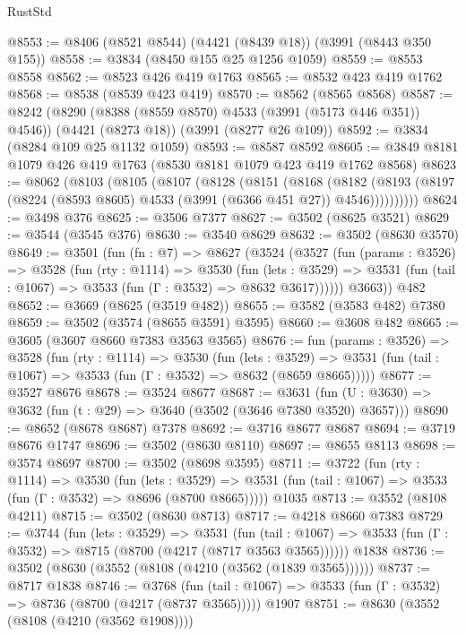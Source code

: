 \begin{lexlean}{RustStd}
\begin{coremodule}
@8553 := @8406 (@8521 @8544) (@4421 (@8439 @18)) (@3991 (@8443 @350 @155))
@8558 := @3834 (@8450 @155 @25 @1256 @1059)
@8559 := @8553 @8558
@8562 := @8523 @426 @419 @1763
@8565 := @8532 @423 @419 @1762
@8568 := @8538 (@8539 @423 @419)
@8570 := @8562 (@8565 @8568)
@8587 := @8242
    (@8290 (@8388 (@8559 @8570) @4533 (@3991 (@5173 @446 @351)) @4546))
    (@4421 (@8273 @18))
    (@3991 (@8277 @26 @109))
@8592 := @3834 (@8284 @109 @25 @1132 @1059)
@8593 := @8587 @8592
@8605 := @3849 @8181 @1079 @426 @419 @1763 (@8530 @8181 @1079 @423 @419 @1762 @8568)
@8623 := @8062
    (@8103
      (@8105
        (@8107
          (@8128
            (@8151
              (@8168
                (@8182
                  (@8193 (@8197 (@8224 (@8593 @8605) @4533 (@3991 (@6366 @451 @27)) @4546))))))))))
@8624 := @3498 @376
@8625 := @3506 @7377
@8627 := @3502 (@8625 @3521)
@8629 := @3544 (@3545 @376)
@8630 := @3540 @8629
@8632 := @3502 (@8630 @3570)
@8649 := @3501
    (fun (fn : @7) =>
    @8627
      (@3524
        (@3527
          (fun (params : @3526) =>
          @3528
            (fun (rty : @1114) =>
            @3530
              (fun (lets : @3529) =>
              @3531 (fun (tail : @1067) => @3533 (fun (Γ : @3532) => @8632 @3617))))))
        @3663))
    @482
@8652 := @3669 (@8625 (@3519 @482))
@8655 := @3582 (@3583 @482) @7380
@8659 := @3502 (@3574 (@8655 @3591) @3595)
@8660 := @3608 @482
@8665 := @3605 (@3607 @8660 @7383 @3563 @3565)
@8676 := fun (params : @3526) =>
  @3528
    (fun (rty : @1114) =>
    @3530
      (fun (lets : @3529) =>
      @3531 (fun (tail : @1067) => @3533 (fun (Γ : @3532) => @8632 (@8659 @8665)))))
@8677 := @3527 @8676
@8678 := @3524 @8677
@8687 := @3631 (fun (U : @3630) => @3632 (fun (t : @29) => @3640 (@3502 (@3646 @7380 @3520) @3657)))
@8690 := @8652 (@8678 @8687) @7378
@8692 := @3716 @8677 @8687
@8694 := @3719 @8676 @1747
@8696 := @3502 (@8630 @8110)
@8697 := @8655 @8113
@8698 := @3574 @8697
@8700 := @3502 (@8698 @3595)
@8711 := @3722
    (fun (rty : @1114) =>
    @3530
      (fun (lets : @3529) =>
      @3531 (fun (tail : @1067) => @3533 (fun (Γ : @3532) => @8696 (@8700 @8665)))))
    @1035
@8713 := @3552 (@8108 @4211)
@8715 := @3502 (@8630 @8713)
@8717 := @4218 @8660 @7383
@8729 := @3744
    (fun (lets : @3529) =>
    @3531
      (fun (tail : @1067) => @3533 (fun (Γ : @3532) => @8715 (@8700 (@4217 (@8717 @3563 @3565))))))
    @1838
@8736 := @3502 (@8630 (@3552 (@8108 (@4210 (@3562 (@1839 @3565))))))
@8737 := @8717 @1838
@8746 := @3768
    (fun (tail : @1067) => @3533 (fun (Γ : @3532) => @8736 (@8700 (@4217 (@8737 @3565)))))
    @1907
@8751 := @8630 (@3552 (@8108 (@4210 (@3562 @1908))))

\end{coremodule}
\end{lexlean}

